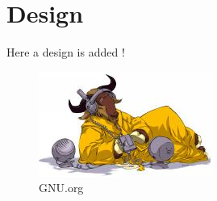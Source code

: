 \newpage
\chapter{Design}
Here a design is added !

\begin{figure}[htbp]
	\centering	\includegraphics{grafiken/listen-tiny.jpg}
	\caption{GNU.org}
	\label{fig:Gnu}
\end{figure}
